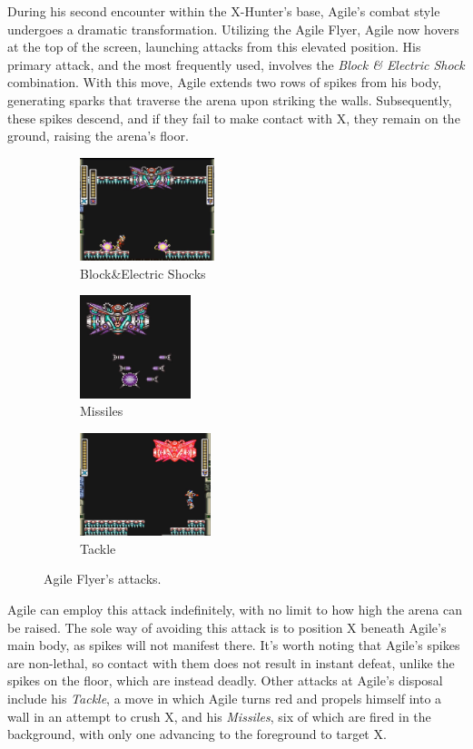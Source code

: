 During his second encounter within the X-Hunter's base, Agile's combat style undergoes a dramatic transformation. Utilizing the Agile Flyer, Agile now hovers at the top of the screen, launching attacks from this elevated position. His primary attack, and the most frequently used, involves the \emph{Block \& Electric Shock} combination. With this move, Agile extends two rows of spikes from his body, generating sparks that traverse the arena upon striking the walls. Subsequently, these spikes descend, and if they fail to make contact with X, they remain on the ground, raising the arena's floor.
\begin{figure}[htp]
	\centering
	\begin{subfigure}{\linewidth}
	\centering
	\includegraphics[height=3cm]{figures/X2/Hunter_stages/Agile_flyer_spike_shock.png}
	\caption{Block\&Electric Shocks}
	\end{subfigure}	
	\begin{subfigure}{0.3\linewidth}
		\centering
		\includegraphics[height=3cm]{figures/X2/Hunter_stages/Agile_flyer_missile.png}
		\caption{Missiles}
	\end{subfigure}
		\begin{subfigure}{.35\linewidth}
		\centering
		\includegraphics[height=3cm]{figures/X2/Hunter_stages/Agile_flyer_dash.jpg}
		\caption{Tackle}	
	\end{subfigure}
	\caption{Agile Flyer's attacks.}	
\end{figure}
 Agile can employ this attack indefinitely, with no limit to how high the arena can be raised. The sole way of avoiding this attack is to position X beneath Agile's main body, as spikes will not manifest there. It's worth noting that Agile's spikes are non-lethal, so contact with them does not result in instant defeat, unlike the spikes on the floor, which are instead deadly. Other attacks at Agile's disposal include his \emph{Tackle}, a move in which Agile turns red and propels himself into a wall in an attempt to crush X, and his \emph{Missiles}, six of which are fired in the background, with only one advancing to the foreground to target X.

